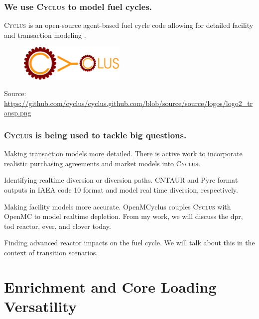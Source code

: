 \documentclass[9pt]{beamer}
\newcommand{\cyclus}{\textsc{Cyclus}\xspace}
\begin{document}
  \begin{frame}
    \frametitle{We use \cyclus to model fuel cycles.}
    \vspace{20pt}
    \cyclus is an open-source agent-based fuel cycle code allowing for detailed facility and transaction modeling \cite{huff_fundamental_2016}.
    \vspace{20pt}
    \begin{figure}
        \centering
        \includegraphics[width=0.45\textwidth]{images/cyclus_logo.png}
    \end{figure}

    \vspace{37pt}
    Source: \url{https://github.com/cyclus/cyclus.github.com/blob/source/source/logos/logo2_transp.png}
  \end{frame}

  \begin{frame}
    \frametitle{\cyclus is being used to tackle big questions.}
    \begin{block}{Making transaction models more detailed.}
        There is active work to incorporate realistic purchasing agreements and market models into \cyclus.
    \end{block}
    \begin{block}{Identifying realtime diversion or diversion paths.}
        CNTAUR \cite{mummah_advanced_2024} and Pyre \cite{westphal_modeling_2019} format outputs in IAEA code 10 format and model real time diversion, respectively.
    \end{block}
    \begin{block}{Making facility models more accurate.}
      OpenMCyclus \cite{openmcyclus_paper} couples \cyclus with OpenMC to model realtime depletion. From my work, we will discuss the \gls{dpr}, \gls{tod} reactor, \gls{ever}, and \gls{clover} today.
  \end{block}
    \begin{block}{Finding advanced reactor impacts on the fuel cycle.}
        We will talk about this in the context of transition scenarios.
    \end{block}
  \end{frame}

\section{Enrichment and Core Loading Versatility}
\end{document}
